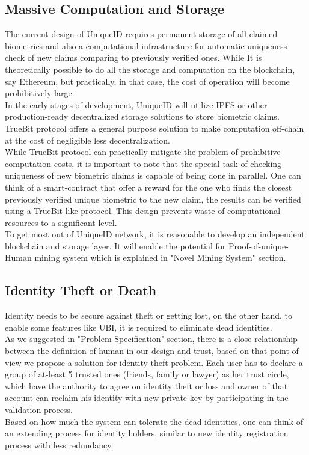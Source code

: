 \documentclass[conference]{IEEEtran}
\begin{document}
\subsection{Massive Computation and Storage}
The current design of UniqueID requires permanent storage of all claimed biometrics and also a computational infrastructure for automatic uniqueness check of new claims comparing to previously verified ones. While It is theoretically possible to do all the storage and computation on the blockchain, say Ethereum, but practically, in that case, the cost of operation will become prohibitively large. \\
In the early stages of development, UniqueID will utilize IPFS or other production-ready decentralized storage solutions to store biometric claims. TrueBit protocol offers a general purpose solution to make computation off-chain at the cost of negligible less decentralization. \\
While TrueBit protocol can practically mitigate the problem of prohibitive computation costs, it is important to note that the special task of checking uniqueness of new biometric claims is capable of being done in parallel. One can think of a smart-contract that offer a reward for the one who finds the closest previously verified unique biometric to the new claim, the results can be verified using a TrueBit like protocol. This design prevents waste of computational resources to a significant level.\\
To get most out of UniqueID network, it is reasonable to develop an independent blockchain and storage layer. It will enable the potential for Proof-of-unique-Human mining system which is explained in "Novel Mining System" section. 
\subsection{Identity Theft or Death}
Identity needs to be secure against theft or getting lost, on the other hand, to enable some features like UBI, it is required to eliminate dead identities.\\
As we suggested in "Problem Specification" section, there is a close relationship between the definition of human in our design and trust, based on that point of view we propose a solution for identity theft problem. Each user has to declare a group of at-least 5 trusted ones (friends, family or lawyer) as her trust circle, which have the authority to agree on identity theft or loss and owner of that account can reclaim his identity with new private-key by participating in the validation process.\\
Based on how much the system can tolerate the dead identities, one can think of an extending process for identity holders, similar to new identity registration process with less redundancy.
\end{document}
